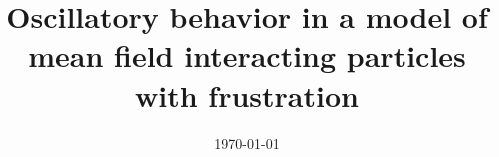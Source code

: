 \documentclass[a4paper,10pt,leqno]{amsart}
\theoremstyle{plain}
\begin{document}
\title[]{Oscillatory behavior in a model of mean field interacting particles with frustration}
\date{\today}

\maketitle
\end{document}
